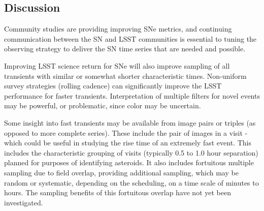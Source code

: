 
\subsection{Discussion}
\label{sec:\chpname:discussion}

Community studies are providing improving SNe metrics, and continuing
communication between the SN and LSST communities is essential to
tuning the observing strategy to deliver the SN time series that are
needed and possible.

Improving LSST science return for SNe will also improve sampling of
all transients with similar or somewhat shorter characteristic times.
Non-uniform survey strategies (rolling cadence) can significantly
improve the LSST performance for faster transients.  Interpretation of
multiple filters for novel events may be powerful, or problematic,
since color may be uncertain.

Some insight into fast transients may be available from image pairs or
triples (as opposed to more complete series).  These include the pair
of images in a visit - which could be useful in studying the rise time
of an extremely fast event.  This includes the characteristic grouping
of visits (typically 0.5 to 1.0 hour separation) planned for purposes
of identifying asteroids.  It also includes fortuitous multiple
sampling due to field overlap, providing additional sampling, which
may be random or systematic, depending on the scheduling, on a time
scale of minutes to hours.  The sampling benefits of this fortuitous
overlap have not yet been investigated.


\navigationbar



















